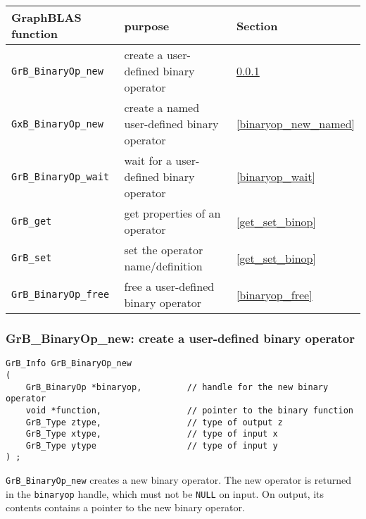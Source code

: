 \documentclass[12pt]{article}
\begin{document}
\vspace{0.2in}
{\footnotesize
\begin{tabular}{lll}
\hline
GraphBLAS function   & purpose                                      & Section \\
\hline
\verb'GrB_BinaryOp_new'   & create a user-defined binary operator   & \ref{binaryop_new} \\
\verb'GxB_BinaryOp_new'   & create a named user-defined binary operator   & \ref{binaryop_new_named} \\
\verb'GrB_BinaryOp_wait'  & wait for a user-defined binary operator & \ref{binaryop_wait} \\
\verb'GrB_get'           & get properties of an operator    & \ref{get_set_binop} \\
\verb'GrB_set'           & set the operator name/definition & \ref{get_set_binop} \\
\verb'GrB_BinaryOp_free'  & free a user-defined binary operator     & \ref{binaryop_free} \\
\hline
\end{tabular}
}
\vspace{0.2in}

\newpage
\subsubsection{{\sf GrB\_BinaryOp\_new:} create a user-defined binary operator}
\label{binaryop_new}

\begin{mdframed}[userdefinedwidth=6in]
{\footnotesize
\begin{verbatim}
GrB_Info GrB_BinaryOp_new
(
    GrB_BinaryOp *binaryop,         // handle for the new binary operator
    void *function,                 // pointer to the binary function
    GrB_Type ztype,                 // type of output z
    GrB_Type xtype,                 // type of input x
    GrB_Type ytype                  // type of input y
) ;
\end{verbatim}
}\end{mdframed}

\verb'GrB_BinaryOp_new' creates a new binary operator.  The new operator is
returned in the \verb'binaryop' handle, which must not be \verb'NULL' on input.
On output, its contents contains a pointer to the new binary operator.
\end{document}
